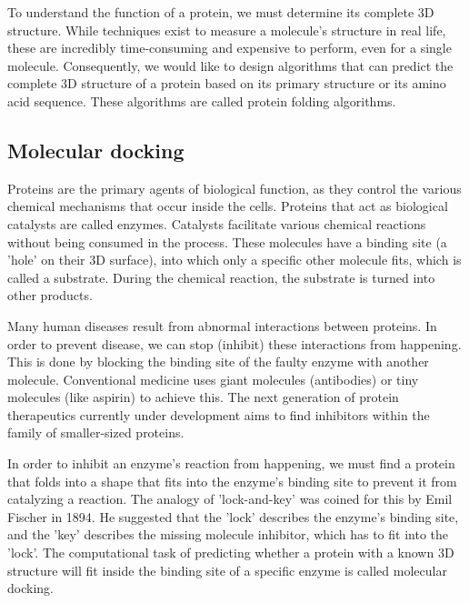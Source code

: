 To understand the function of a protein, we must determine its complete 3D structure. While techniques exist to measure a molecule's structure in real life, these are incredibly time-consuming and expensive to perform, even for a single molecule. Consequently, we would like to design algorithms that can predict the complete 3D structure of a protein based on its primary structure or its amino acid sequence. These algorithms are called protein folding algorithms.

\subsection{Molecular docking}

Proteins are the primary agents of biological function, as they control the various chemical mechanisms that occur inside the cells. Proteins that act as biological catalysts are called enzymes. Catalysts facilitate various chemical reactions without being consumed in the process. These molecules have a binding site (a 'hole' on their 3D surface), into which only a specific other molecule fits, which is called a substrate. During the chemical reaction, the substrate is turned into other products.  \cite{fionda_networks_2019}

Many human diseases result from abnormal interactions between proteins. In order to prevent disease, we can stop (inhibit) these interactions from happening. This is done by blocking the binding site of the faulty enzyme with another molecule. Conventional medicine uses giant molecules (antibodies) or tiny molecules (like aspirin) to achieve this. The next generation of protein therapeutics currently under development aims to find inhibitors within the family of smaller-sized proteins.
 \cite{ryan_proteinprotein_2005}

In order to inhibit an enzyme's reaction from happening, we must find a protein that folds into a shape that fits into the enzyme's binding site to prevent it from catalyzing a reaction. The analogy of 'lock-and-key' was coined for this by Emil Fischer in 1894. He suggested that the 'lock' describes the enzyme's binding site, and the 'key' describes the missing molecule inhibitor, which has to fit into the 'lock'. \cite{a_molecular_2018} \cite{walker_molecular_2008} The computational task of predicting whether a protein with a known 3D structure will fit inside the binding site of a specific enzyme is called molecular docking.

